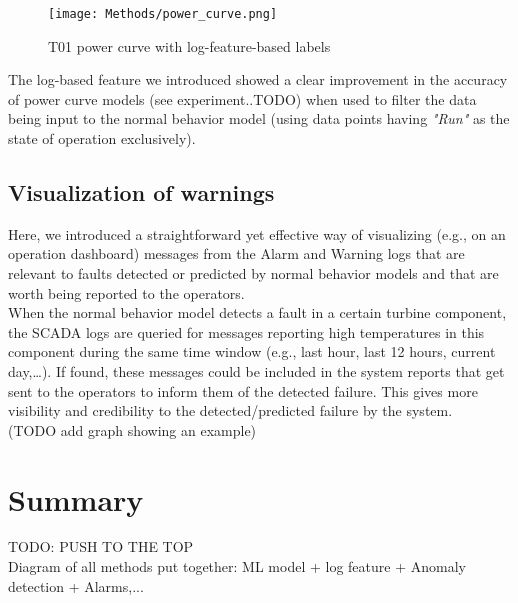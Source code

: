   \begin{figure}[!htbp]
    \begin{center}
      \texttt{[image: Methods/power\_curve.png]}
    \end{center}
    \caption{T01 power curve with log-feature-based labels}
    \label{fig:power_curve}
  \end{figure}

  The log-based feature we introduced showed a clear improvement in the accuracy of power curve models (see experiment..TODO) when used to filter the data being input 
  to the normal behavior model (using data points having \emph{"Run"} as the state of operation exclusively).

\subsection{Visualization of warnings}
  Here, we introduced a straightforward yet effective way of visualizing (e.g., on an operation dashboard) messages from the Alarm and Warning logs that are relevant 
  to faults detected or predicted by normal behavior models and that are worth being reported to the operators.\\
  When the normal behavior model detects a fault in a certain turbine component, the SCADA logs are queried for messages reporting high temperatures in this component 
  during the same time window (e.g., last hour, last 12 hours, current day,\dots). If found, these messages could be included in the system reports that get sent to the operators
  to inform them of the detected failure. This gives more visibility and credibility to the detected/predicted failure by the system.\\
  (TODO add graph showing an example)

\clearpage

\section{Summary}
TODO:
PUSH TO THE TOP\\
Diagram of all methods put together: ML model + log feature + Anomaly detection + Alarms,...